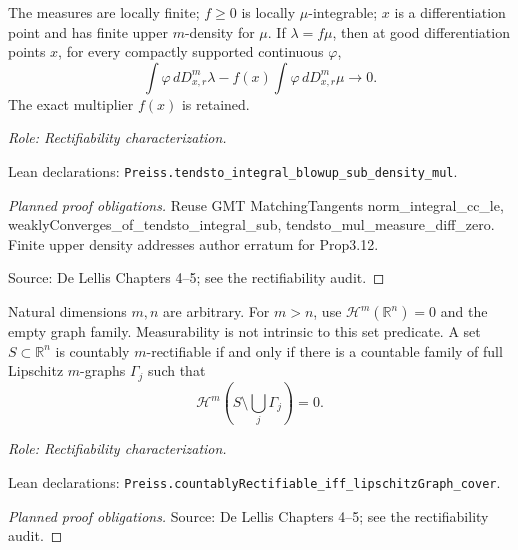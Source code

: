 \begin{lemma}
\label{lem:normalized-density-transfer}







The measures are locally finite; \(f\geq0\) is locally \(\mu\)-integrable; \(x\) is a differentiation point and has finite upper \(m\)-density for \(\mu\).
If \(\lambda=f\mu\), then at good differentiation points \(x\), for every compactly supported continuous \(\varphi\),
\[
 \int\varphi\,dD^m_{x,r}\lambda-
 f(x)\int\varphi\,dD^m_{x,r}\mu\longrightarrow0.
\]
The exact multiplier \(f(x)\) is retained.
\par\emph{Role: Rectifiability characterization.}
\par Lean declarations: \texttt{Preiss.tendsto\_integral\_blowup\_sub\_density\_mul}.
\end{lemma}
\begin{proof}[Planned proof obligations]

Reuse GMT MatchingTangents norm\_integral\_cc\_le, weaklyConverges\_of\_tendsto\_integral\_sub, tendsto\_mul\_measure\_diff\_zero. Finite upper density addresses author erratum for Prop3.12.
\par Source: De Lellis Chapters 4--5; see the rectifiability audit.
\end{proof}

\begin{lemma}
\label{lem:graphs}







Natural dimensions \(m,n\) are arbitrary. For \(m>n\), use \(\mathcal H^m(\mathbb R^n)=0\) and the empty graph family. Measurability is not intrinsic to this set predicate.
A set \(S\subset\mathbb R^n\) is countably \(m\)-rectifiable if and only if there is a countable family of full Lipschitz \(m\)-graphs \(\Gamma_j\) such that
\[
 \mathcal H^m(S\setminus\bigcup_j\Gamma_j)=0.
\]
\par\emph{Role: Rectifiability characterization.}
\par Lean declarations: \texttt{Preiss.countablyRectifiable\_iff\_lipschitzGraph\_cover}.
\end{lemma}
\begin{proof}[Planned proof obligations]

\par Source: De Lellis Chapters 4--5; see the rectifiability audit.
\end{proof}

